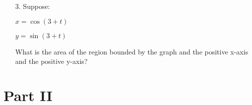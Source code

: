 \begin{itemize}
        \item [3.] Suppose:
        
        $x=\cos(3+t)$

        $y=\sin(3+t)$

        What is the area of the region bounded by the graph and the positive x-axis and the positive y-axis?
        \\
        \begin{mdframed}
            
        \end{mdframed}
    \end{itemize}

    \pagebreak

    \section*{Part II}


